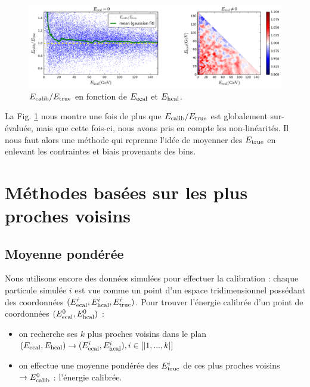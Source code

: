 \documentclass[11pt,a4paper]{article}
\begin{document}
\begin{figure}[!h]
\begin{center}
\includegraphics[width=\textwidth]{images/pictures/testCalibrationLego/CalibrationLego_ecalib_over_etrue_functionof_ecal_hcal.png}
\caption{$E_{\rm calib}/E_{\rm true}$ en fonction de $E_{\rm ecal}$ et $E_{\rm hcal}$.}
\label{ecaliboveretrueCL_etrue}
\end{center}
\end{figure}

La Fig. \ref{ecaliboveretrueCL_etrue} nous montre une fois de plus que $E_{\rm calib}/E_{\rm true}$  est globalement sur-évaluée, mais que cette fois-ci, nous avons pris en compte les non-linéarités. Il nous faut alors une méthode qui reprenne l'idée de moyenner des $E_{\rm true}$ en enlevant les contraintes et biais provenants des bins.

\section{Méthodes basées sur les plus proches voisins}
\label{KNN}
\subsection{Moyenne pondérée}
Nous utilisons encore des données simulées pour effectuer la calibration : chaque particule simulée $i$ est vue comme un point d'un espace tridimensionnel possédant des coordonnées $(E_{\rm ecal}^i, E_{\rm hcal}^i,E_{\rm true}^i)$.
Pour trouver l'énergie calibrée d'un point de coordonnées $(E_{\rm ecal}^0, E_{\rm hcal}^0)$ :
\begin{itemize}
	\item on recherche ses $k$ plus proches voisins dans le plan $(E_{\rm ecal}, E_{\rm hcal}) \rightarrow (E_{\rm ecal}^i, E_{\rm hcal}^i), i \in [|1,...,k|]$
	\item on effectue une moyenne pondérée des $E_{\rm true}^i$ de ces plus proches voisins $\rightarrow E_{\rm calib}^0$ : l'énergie calibrée.
\end{itemize}
\end{document}
